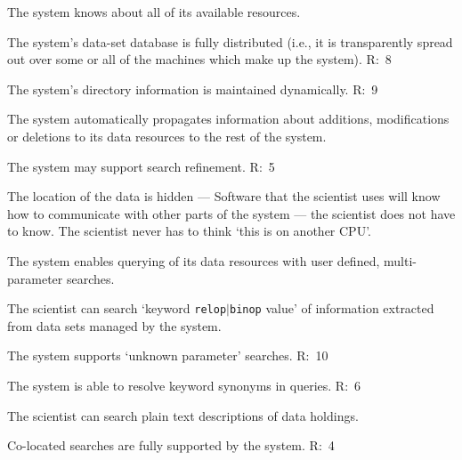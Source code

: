 \begin{list}{}{}
\begin{list}{--}{}
\begin{list}{--}{}
     \item The system knows about all of its available resources.

     \item The system's data-set database is fully distributed (i.e., it
           is transparently spread out over some or all of the machines
           which make up the system). R:~8

     \item The system's directory information is maintained dynamically. R:~9

     \item The system automatically propagates information about additions,   
           modifications or deletions to its data resources to the
           rest of the system.

     \item The system may support search refinement. R:~5

\end{list}

\item The location of the data is hidden --- Software that the scientist
uses will know how to communicate with other parts of the system --- the
scientist does not have to know. The scientist never has to think `this is on
another CPU'.

\item The system enables querying of its data resources with user defined, 
multi-parameter searches. 

\begin{list}{--}{}

     \item The scientist can search `keyword {\tt relop$|$binop} value' of
           information extracted from data sets managed by the system.

     \item The system supports `unknown parameter' searches. R:~10

     \item The system is able to resolve keyword synonyms in queries. R:~6

\end{list}

\item The scientist can search plain text descriptions of data holdings.

\item Co-located searches are fully supported by the system. R:~4


\end{list}
\end{list}
